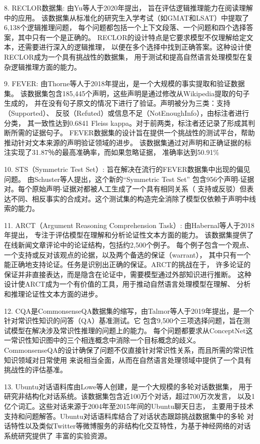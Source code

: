 8. RECLOR数据集\cite{yu2020reclor}: 由Yu等人于2020年提出，
旨在评估逻辑推理能力在阅读理解中的应用。
该数据集从标准化的研究生入学考试（如GMAT和LSAT）中提取了6,138个逻辑推理问题，
每个问题都包括一个上下文段落、一个问题和四个选择答案，其中只有一个是正确的。
RECLOR的设计特点是它要求模型不仅理解给定文本，还需要进行深入的逻辑推理，
以便在多个选择中找到正确答案。这种设计使RECLOR成为一个具有挑战性的数据集，
用于测试和提高自然语言处理模型在复杂逻辑推理方面的能力。

9. FEVER\cite{thorne2018fever}: 由Thorne等人于2018年提出，是一个大规模的事实提取和验证数据集。
该数据集包含185,445个声明，这些声明是通过修改从Wikipedia提取的句子生成的，
并在没有句子原文的情况下进行了验证。声明被分为三类：支持（Supported）、
反驳（Refuted）或信息不足（NotEnoughInfo），由标注者进行分类，
其一致性达到0.6841 Fleiss kappa。对于前两类，标注者还记录了形成其判断所需的证据句子。
FEVER数据集的设计旨在提供一个挑战性的测试平台，帮助推动针对文本来源的声明验证领域的进步。
该数据集通过对声明和正确证据的标注实现了31.87％的最高准确率，而如果忽略证据，
准确率达到50.91\%

10. STS（Symmetric Test Set）\cite{schuster2019towards}: 旨在解决在流行的FEVER\cite{thorne2018fever}数据集中出现的偏见问题。
由Schuster等人提出，这个新的``Symmetric Test Set''
包含956个声明-证据对。每个原始声明-证据对都被人工生成了一个具有相同关系（
支持或反驳）但表达不同、相反事实的合成对。这个测试集的构造完全消除了模型仅依赖于声明中线索的能力。

11. ARCT（Argument Reasoning Comprehension Task）\cite{habernal2018argument}: 由Habernal等人于2018年提出，
专注于评估模型在理解和分析论证性文本方面的能力。
该数据集提供了在线新闻文章评论中的论证结构，包括约2,500个例子。
每个例子包含一个观点、一个支持或反对该观点的论据，以及两个备选的保证（warrant），
其中只有一个能正确地支持论证。任务是识别出正确的保证。ARCT的挑战在于，
许多论证的保证并非直接表达，而是隐含在论证中，需要模型通过外部知识进行推断。
这种设计使ARCT成为一个有价值的工具，用于推动自然语言处理模型在理解、
分析和推理论证性文本方面的进步。

12. CQA是CommonsenseQA\cite{talmor2019commonsenseqa}数据集的缩写，由Talmor等人于2019年提出，是一个针对常识性知识的问答（QA）基准测试。它
包含9,500个三项选择问题，旨在测试模型在解决涉及常识性推理的问题上的能力。
每个问题都要求从ConceptNet这一常识性知识图中的三个相连概念中消除一个目标概念的歧义。
CommonsenseQA的设计确保了问题不仅直接针对常识性关系，而且所需的常识性知识领域对日常使用
来说相当全面，从而在自然语言处理领域中提供了一个具有挑战性的评估基准。

13. Ubuntu对话语料库\cite{lowe2015ubuntu}由Lowe等人创建，是一个大规模的多轮对话数据集，
用于研究非结构化对话系统。该数据集包含近100万个对话，超过700万次发言，
以及1亿个词汇。这些对话来源于2004年至2015年间的Ubuntu聊天日志，
主要用于技术支持和问题解答。Ubuntu对话语料库结合了对话状态跟踪挑战数据集中的多轮
对话特性以及类似Twitter等微博服务的非结构化交互特性，为基于神经网络的对话系统研究提供了
丰富的实验资源。


